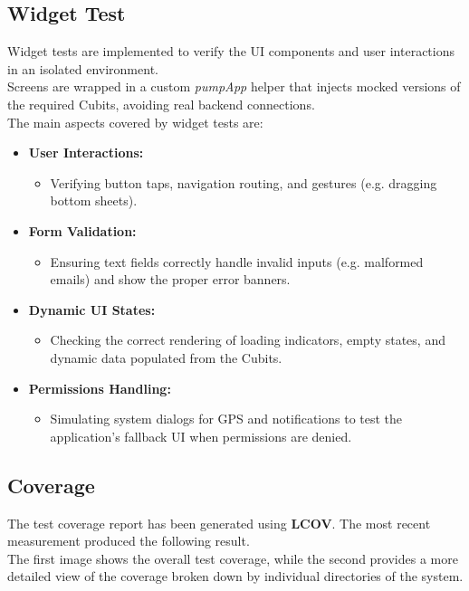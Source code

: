 \documentclass[12pt]{article}
\begin{document}
\subsection{Widget Test}
Widget tests are implemented to verify the UI components and user interactions in an isolated environment. \\
Screens are wrapped in a custom \textit{pumpApp} helper that injects mocked versions of the required Cubits, avoiding real backend connections. \\
The main aspects covered by widget tests are: \\
\begin{itemize}
    \item \textbf{User Interactions:} 
        \begin{itemize}
            \item Verifying button taps, navigation routing, and gestures (e.g. dragging bottom sheets).
        \end{itemize}
    \item \textbf{Form Validation:} 
        \begin{itemize}
            \item Ensuring text fields correctly handle invalid inputs (e.g. malformed emails) and show the proper error banners.
        \end{itemize}
    \item \textbf{Dynamic UI States:} 
        \begin{itemize}
            \item Checking the correct rendering of loading indicators, empty states, and dynamic data populated from the Cubits.
        \end{itemize}
    \item \textbf{Permissions Handling:} 
        \begin{itemize}
            \item Simulating system dialogs for GPS and notifications to test the application's fallback UI when permissions are denied.
        \end{itemize}
\end{itemize}

\subsection{Coverage}
    The test coverage report has been generated using \textbf{LCOV}. The most recent measurement produced the following result. \\
    The first image shows the overall test coverage, while the second provides a more detailed view of the coverage broken down by individual directories of the system.
\end{document}
